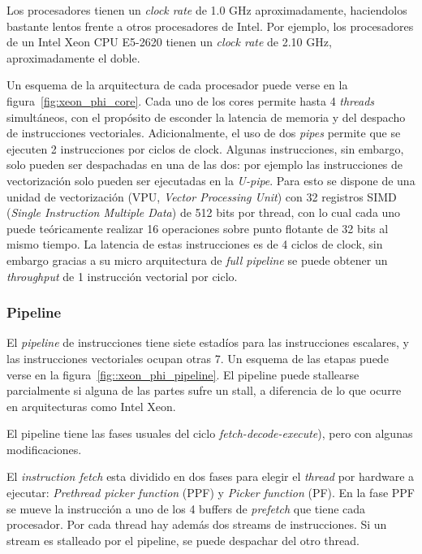 Los procesadores tienen un \textit{clock rate} de 1.0 GHz aproximadamente, haciendolos bastante lentos frente
a otros procesadores de Intel. Por ejemplo, los procesadores de un Intel Xeon CPU E5-2620 tienen un \textit{clock rate}
de 2.10 GHz, aproximadamente el doble.

Un esquema de la arquitectura de cada procesador puede verse en la figura~\ref{fig:xeon_phi_core}. Cada uno de los cores
permite hasta 4 \textit{threads} simult\'aneos, con el prop\'osito de esconder la latencia de memoria y del despacho de
instrucciones vectoriales. Adicionalmente, el uso de dos \textit{pipes} permite que se ejecuten 2
instrucciones por ciclos de clock.  Algunas instrucciones, sin embargo, solo pueden ser despachadas en una de las dos:
por ejemplo las instrucciones de vectorizaci\'on solo pueden ser ejecutadas en la \textit{U-pipe}. Para esto se dispone
de una unidad de vectorizaci\'on (VPU, \textit{Vector Processing Unit}) con 32 registros SIMD (\textit{Single Instruction
Multiple Data}) de 512 bits por thread, con lo cual cada uno puede te\'oricamente realizar 16 operaciones sobre punto flotante de
32 bits al mismo tiempo. La latencia de estas instrucciones es de 4 ciclos de clock, sin embargo gracias a su micro
arquitectura de \textit{full pipeline} se puede obtener un \textit{throughput} de 1 instrucci\'on vectorial por ciclo.

\subsubsection{Pipeline}

El \textit{pipeline} de instrucciones tiene siete estad\'ios para las instrucciones escalares, y las
instrucciones vectoriales ocupan otras 7. Un esquema de las etapas puede verse en la figura~\ref{fig::xeon_phi_pipeline}.
El pipeline puede stallearse parcialmente si alguna de las partes sufre un stall, a diferencia de lo que ocurre en 
arquitecturas como Intel Xeon.

El pipeline tiene las fases usuales del ciclo \textit{fetch-decode-execute}), pero con algunas modificaciones.

El \textit{instruction fetch} esta dividido en dos fases para elegir el \textit{thread} por hardware a ejecutar:
\textit{Prethread picker function} (PPF) y \textit{Picker function} (PF). En la fase PPF se mueve la instrucci\'on
a uno de los 4 buffers de \textit{prefetch} que tiene cada procesador. Por cada thread hay adem\'as dos streams de
instrucciones. Si un stream es stalleado por el pipeline, se puede despachar del otro thread.

